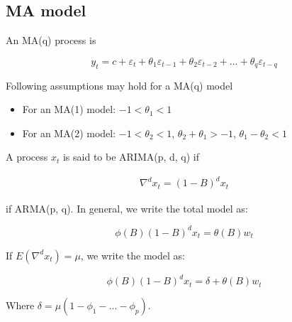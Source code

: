 \documentclass[
  12pt,
]{article}
\providecommand{\tightlist}{%
  \setlength{\itemsep}{0pt}\setlength{\parskip}{0pt}}
\begin{document}
\hypertarget{ma-model}{%
\subsection{MA model}\label{ma-model}}

An MA(q) process is

\begin{equation}
\label{eqn:ma-process}
y_t = c + \varepsilon_t + \theta_1 \varepsilon_{t-1} + \theta_2 \varepsilon_{t-2} + ... + \theta_q \varepsilon_{t-q}
\end{equation}

Following assumptions may hold for a MA(q) model

\begin{itemize}
\tightlist
\item
  For an MA(1) model: \(-1 < \theta_1 < 1\)
\item
  For an MA(2) model: \(-1 < \theta_2 < 1\), \(\theta_2 + \theta_1 > -1\), \(\theta_1 - \theta_2 < 1\)
\end{itemize}

A process \(x_t\) is said to be ARIMA(p, d, q) if

\begin{equation}
\label{eqn:arima}
\begin{aligned}
  \nabla^d x_t = ( 1- B)^d x_t
\end{aligned}
\end{equation}

if ARMA(p, q). In general, we write the total model as:

\begin{equation}
\label{eqn:arima-total}
\phi (B)(1-B)^d x_t = \theta (B)w_t
\end{equation}

If \(E (\nabla^d x_t) = \mu\), we write the model as:

\begin{equation}
\label{eqn:arima-full}
\phi(B)(1-B)^d x_t = \delta + \theta (B) w_t
\end{equation}

Where \(\delta = \mu (1-\phi_1 - ... - \phi_p )\).
\end{document}
